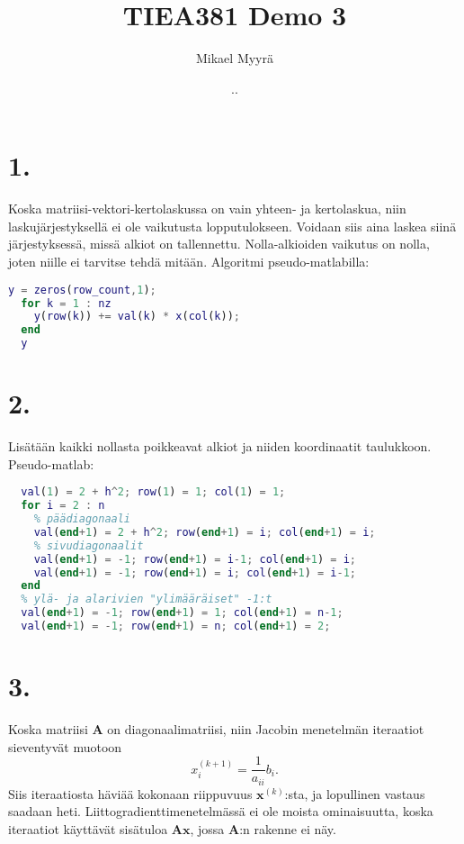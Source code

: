 \documentclass{article}
\title{TIEA381 Demo 3}
\author{Mikael Myyrä}
\date{\number\day.\number\month.\number\year}
\begin{document}
\maketitle

\section*{1.}

Koska matriisi-vektori-kertolaskussa on vain yhteen- ja kertolaskua,
niin laskujärjestyksellä ei ole vaikutusta lopputulokseen. Voidaan siis aina
laskea siinä järjestyksessä, missä alkiot on tallennettu.
Nolla-alkioiden vaikutus on nolla, joten niille ei tarvitse tehdä mitään.
Algoritmi pseudo-matlabilla:
\begin{lstlisting}[language=Matlab]
  y = zeros(row_count,1);
  for k = 1 : nz
    y(row(k)) += val(k) * x(col(k));
  end
  y
\end{lstlisting}


\section*{2.}

Lisätään kaikki nollasta poikkeavat alkiot ja niiden koordinaatit taulukkoon.
Pseudo-matlab:
\begin{lstlisting}[language=Matlab]
  % vasen yläkulma erikseen, jotta voidaan käyttää `i-1` silmukassa
  val(1) = 2 + h^2; row(1) = 1; col(1) = 1;
  for i = 2 : n
    % päädiagonaali
    val(end+1) = 2 + h^2; row(end+1) = i; col(end+1) = i;
    % sivudiagonaalit
    val(end+1) = -1; row(end+1) = i-1; col(end+1) = i;
    val(end+1) = -1; row(end+1) = i; col(end+1) = i-1;
  end
  % ylä- ja alarivien "ylimääräiset" -1:t
  val(end+1) = -1; row(end+1) = 1; col(end+1) = n-1;
  val(end+1) = -1; row(end+1) = n; col(end+1) = 2;
\end{lstlisting}


\section*{3.}

Koska matriisi $\mathbf{A}$ on diagonaalimatriisi, niin Jacobin menetelmän iteraatiot
sieventyvät muotoon
\[
  x_i^{(k+1)} = \frac{1}{a_{ii}}b_i.
\]
Siis iteraatiosta häviää kokonaan riippuvuus $\mathbf{x}^{(k)}$:sta,
ja lopullinen vastaus saadaan heti.
Liittogradienttimenetelmässä ei ole moista ominaisuutta, koska
iteraatiot käyttävät sisätuloa $\mathbf{Ax}$, jossa $\mathbf{A}$:n
rakenne ei näy.
\end{document}

